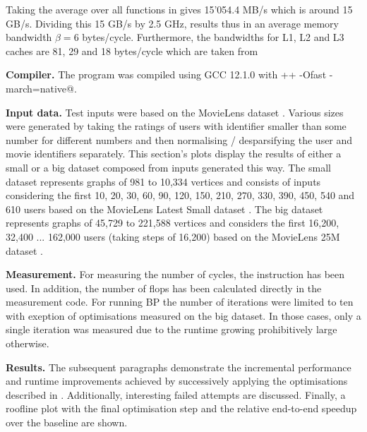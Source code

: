 \documentclass[letterpaper]{article}
\let\cref=\Cref %
\newcommand{\mypar}[1]{{\bf #1.}}
\begin{document}
Taking the average over all functions in \cref{streamBenchmarkResults} gives 15'054.4 MB/s which is around 15 GB/s.
Dividing this 15 GB/s by 2.5 GHz, results thus in an average memory bandwidth $\beta=6$ bytes/cycle. Furthermore, the bandwidths for L1, L2 and L3 caches are 81, 29 and 18 bytes/cycle which are taken from \cite{optimisationManual}

\mypar{Compiler} The program was compiled using GCC 12.1.0 with \verb@g++ -Ofast -march=native@.

\mypar{Input data} Test inputs were based on the MovieLens dataset \cite{movieLens}.
Various sizes were generated by taking the ratings of users with identifier smaller than some number for different numbers
and then normalising / desparsifying the user and movie identifiers separately.
This section's plots display the results of either a small or a big dataset composed from inputs generated this way.
The small dataset represents graphs of 981 to 10,334 vertices and consists of inputs %
considering the first 10, 20, 30, 60, 90, 120, 150, 210, 270, 330, 390, 450, 540 and 610 users based on the MovieLens Latest Small dataset \cite{movieLensSmall}.
The big dataset represents graphs of 45,729 to 221,588 vertices and considers the first 16,200, 32,400 ... 162,000 users (taking steps of 16,200) based on the MovieLens 25M dataset \cite{movieLensBig}.

\mypar{Measurement} For measuring the number of cycles, the \verb@RDTSC@ instruction has been used.
In addition, the number of flops has been calculated directly in the measurement code.
For running BP the number of iterations were limited to ten with exeption of optimisations  measured on the big dataset.
In those cases, only a single iteration was measured due to the runtime growing prohibitively large otherwise.\sr{*}

\mypar{Results}  The subsequent paragraphs demonstrate the incremental performance and runtime improvements achieved by successively applying the optimisations described in \cref{sec:yourmethod}.
Additionally, interesting failed attempts are discussed.  
Finally, a roofline plot with the final optimisation step and the relative end-to-end speedup over the baseline  are shown.
\end{document}
